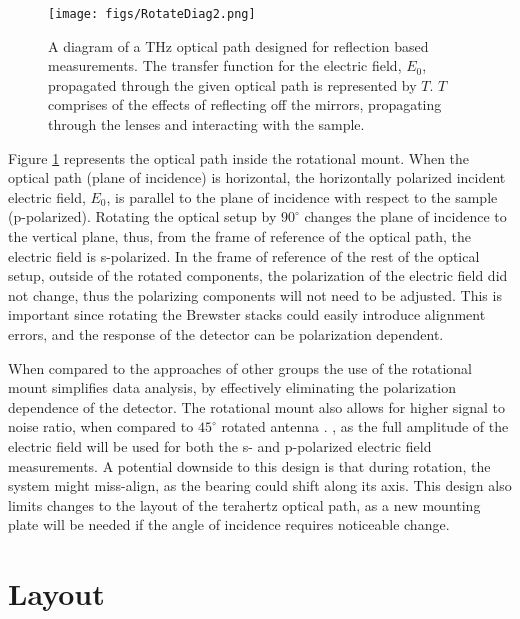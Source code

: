 \begin{figure}[H]
\begin{center}
	 \texttt{[image: figs/RotateDiag2.png]}
	 \caption[Rotational mount diagram]{A diagram of a THz optical path designed for reflection based measurements. The transfer function for the electric field, $E_{0}$, propagated through the given optical path is represented by $T$. $T$ comprises of the effects of reflecting off the mirrors, propagating through the lenses and interacting with the sample.}
   \label{fig:RotDiag}
\end{center}
\end{figure}

Figure \ref{fig:RotDiag} represents the optical path inside the rotational mount. When the optical path (plane of incidence) is horizontal, the horizontally polarized incident electric field, $E_{0}$, is parallel to the plane of incidence with respect to the sample (p-polarized). Rotating the optical setup by $90^{\circ}$ changes the plane of incidence to the vertical plane, thus, from the frame of reference of the optical path, the electric field is s-polarized. In the frame of reference of the rest of the optical setup, outside of the rotated components, the polarization of the electric field did not change, thus the polarizing components will not need to be adjusted. This is important since rotating the Brewster stacks could easily introduce alignment errors, and the response of the detector can be polarization dependent.

When compared to the approaches of other groups \cite{Xuequan2018, Neshat2012} the use of the rotational mount simplifies data analysis, by effectively eliminating the polarization dependence of the detector. The rotational mount also allows for higher signal to noise ratio, when compared to $45^{\circ}$ rotated antenna \cite{Xuequan2018, Neshat2012}.
, as the full amplitude of the electric field will be used for both the s- and p-polarized electric field measurements. A potential downside to this design is that during rotation, the system might miss-align, as the bearing could shift along its axis. This design also limits changes to the layout of the terahertz optical path, as a new mounting plate will be needed if the angle of incidence requires noticeable change.

\section{Layout}
\label{sec: Lay}


